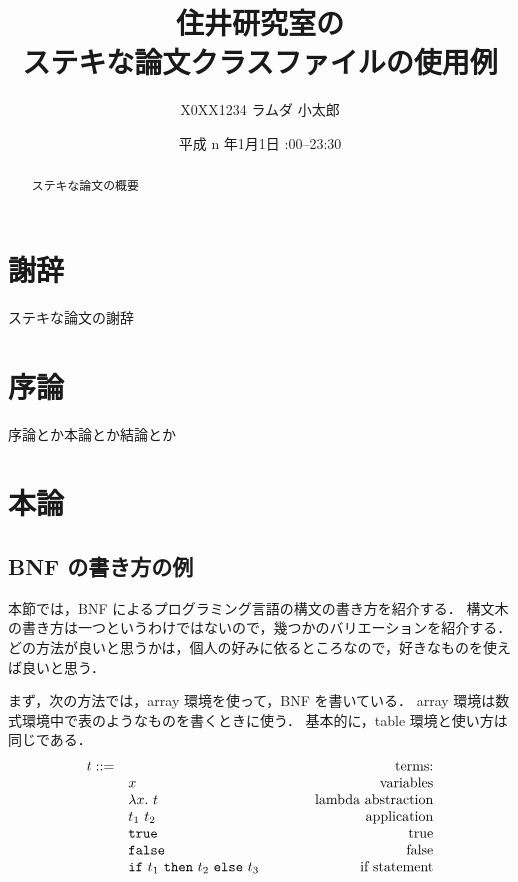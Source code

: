 \documentclass[sharedthmnum]{sumiilab-paper}
\title{住井研究室の\\ステキな論文クラスファイルの使用例}
\author{X0XX1234 ラムダ 小太郎}
\institute{東北大学 工学部\\情報知能システム総合学科}%
\date{平成 n 年1月1日 \quad 23:00--23:30}
\newcommand{\TRUE}{\texttt{true}}
\newcommand{\FALSE}{\texttt{false}}
\newcommand{\IF}{\texttt{if}}
\newcommand{\THEN}{\texttt{then}}
\newcommand{\ELSE}{\texttt{else}}
\begin{document}
\maketitle

\begin{abstract}
ステキな論文の概要
\end{abstract}

\chapter*{謝辞}

ステキな論文の謝辞

\tableofcontents


\chapter{序論}

序論とか本論とか結論とか \cite{Pierce:TypeSystems}

\chapter{本論}

\section{BNF の書き方の例}

本節では，BNF によるプログラミング言語の構文の書き方を紹介する．
構文木の書き方は一つというわけではないので，幾つかのバリエーションを紹介する．
どの方法が良いと思うかは，個人の好みに依るところなので，好きなものを使えば良いと思う．

まず，次の方法では，array 環境を使って，BNF を書いている．
array 環境は数式環境中で表のようなものを書くときに使う．
基本的に，table 環境と使い方は同じである．
\[
\begin{array}{rl@{\qquad\qquad}r}
  t ::=
  & & \mbox{terms:} \\
  & x & \mbox{variables} \\
  & \lambda x.~t & \mbox{lambda abstraction} \\
  & t_1~t_2 & \mbox{application} \\
  & \TRUE & \mbox{true} \\
  & \FALSE & \mbox{false} \\
  & \IF~t_1~\THEN~t_2~\ELSE~t_3 & \mbox{if statement}
\end{array}
\]
\end{document}
